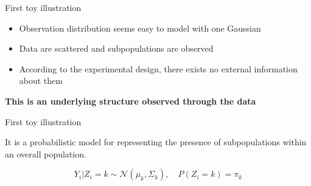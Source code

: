 \documentclass[compress,10pt]{beamer}
\begin{document}
\begin{frame}{First toy illustration}
    \begin{itemize}
    \item[]  {Observation distribution seems easy to model with one Gaussian}
    \item[]  {Data are scattered and subpopulations are observed}
    \item[]  {According to the experimental design, there exists no external information about them}
    \end{itemize}
  
  {\centerline{\textbf {This is an underlying structure observed through the data}}}
\end{frame}


\begin{frame}{First  toy illustration}

\begin{definition}
It is a probabilistic model for representing the presence of subpopulations within an overall population.
\end{definition}
$$Y_i | Z_i = k  \sim \mathcal{N}(\mu_k,\Sigma_k), \quad  P(Z_i = k) = \pi_k
$$

\vspace{-1em}


\end{frame}
\end{document}
